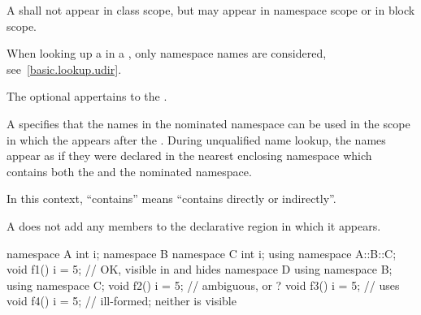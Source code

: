 \pnum
A  shall not appear in class scope, but may
appear in namespace scope or in block scope.
\begin{note}
When looking up a  in a
, only namespace names are considered,
see~\ref{basic.lookup.udir}.
\end{note}
The optional  appertains to the .

\pnum
A  specifies that the names in the nominated
namespace can be used in the scope in which the
 appears after the .
During unqualified name lookup, the names
appear as if they were declared in the nearest enclosing namespace which
contains both the  and the nominated
namespace.
\begin{note}
In this context, ``contains'' means ``contains directly or indirectly''.
\end{note}

\pnum
A  does not add any members to the declarative
region in which it appears.
\begin{example}
\begin{codeblock}
namespace A {
  int i;
  namespace B {
    namespace C {
      int i;
    }
    using namespace A::B::C;
    void f1() {
      i = 5;        // OK,  visible in  and hides 
    }
  }
  namespace D {
    using namespace B;
    using namespace C;
    void f2() {
      i = 5;        // ambiguous,  or ?
    }
  }
  void f3() {
    i = 5;          // uses 
  }
}
void f4() {
  i = 5;            // ill-formed; neither  is visible
}
\end{codeblock}
\end{example}


